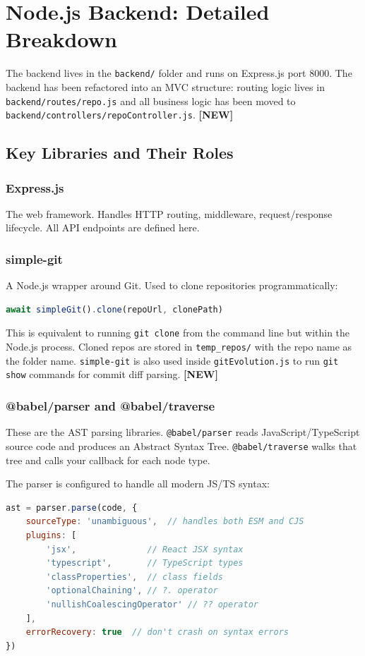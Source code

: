 \documentclass[a4paper,11pt]{article}
\begin{document}
\section{Node.js Backend: Detailed Breakdown}

The backend lives in the \texttt{backend/} folder and runs on Express.js port 8000. The backend has been refactored into an MVC structure: routing logic lives in \texttt{backend/routes/repo.js} and all business logic has been moved to \texttt{backend/controllers/repoController.js}. \textbf{[NEW]}

\subsection{Key Libraries and Their Roles}

\subsubsection{Express.js}
The web framework. Handles HTTP routing, middleware, request/response lifecycle. All API endpoints are defined here.

\subsubsection{simple-git}
A Node.js wrapper around Git. Used to clone repositories programmatically:
\begin{lstlisting}[language=JavaScript]
await simpleGit().clone(repoUrl, clonePath)
\end{lstlisting}
This is equivalent to running \texttt{git clone} from the command line but within the Node.js process. Cloned repos are stored in \texttt{temp\_repos/} with the repo name as the folder name. \texttt{simple-git} is also used inside \texttt{gitEvolution.js} to run \texttt{git show} commands for commit diff parsing. \textbf{[NEW]}

\subsubsection{@babel/parser and @babel/traverse}
These are the AST parsing libraries. \texttt{@babel/parser} reads JavaScript/TypeScript source code and produces an Abstract Syntax Tree. \texttt{@babel/traverse} walks that tree and calls your callback for each node type.

The parser is configured to handle all modern JS/TS syntax:
\begin{lstlisting}[language=JavaScript]
ast = parser.parse(code, {
    sourceType: 'unambiguous',  // handles both ESM and CJS
    plugins: [
        'jsx',              // React JSX syntax
        'typescript',       // TypeScript types
        'classProperties',  // class fields
        'optionalChaining', // ?. operator
        'nullishCoalescingOperator' // ?? operator
    ],
    errorRecovery: true  // don't crash on syntax errors
})
\end{lstlisting}
\end{document}
